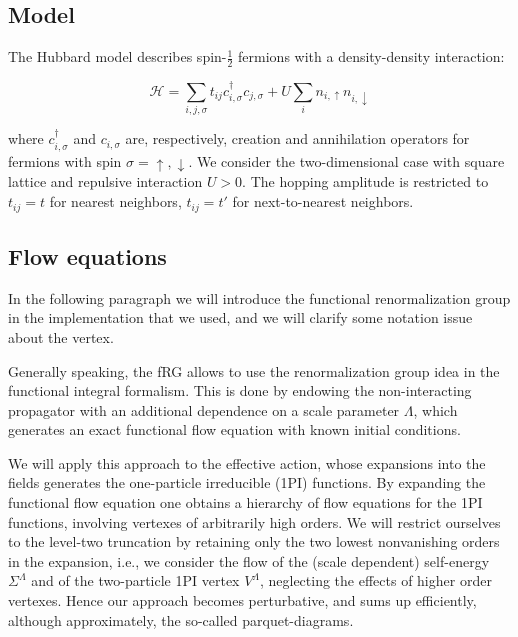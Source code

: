 
\subsection{Model}

The Hubbard model\cite{Hubbard1963} describes spin-$\frac{1}{2}$ fermions with a density-density interaction:

\begin{equation}
\mathcal{H} = \sum_{i,j,\sigma} t_{ij} c^{\dagger}_{i,\sigma} c_{j,\sigma} + U \sum_{i} n_{i,\uparrow} n_{i,\downarrow}
\end{equation}

where $c^{\dagger}_{i,\sigma}$ and $c_{i,\sigma}$ are, respectively, creation and annihilation operators 
for fermions with spin $\sigma=\uparrow,\downarrow$. We consider the two-dimensional case with square lattice and repulsive interaction $U>0$. The hopping amplitude is restricted to $t_{ij} = t$ for nearest neighbors, $t_{ij}=t'$ for next-to-nearest neighbors.




\subsection{Flow equations}


In the following paragraph we will introduce the functional renormalization group\cite{Metzner2012,Platt2013} in the implementation that we used, and we will clarify some notation issue about the vertex. 

Generally speaking, the fRG allows to use the renormalization group idea in the functional integral formalism. 
This is done by endowing the non-interacting propagator with an additional dependence on a scale parameter $\Lambda$, which generates an exact functional flow equation with known initial conditions. 

We will apply this approach to the effective action, whose expansions into the fields generates the one-particle irreducible (1PI)  functions. By expanding the functional flow equation one obtains a hierarchy of flow equations for the 1PI functions, involving vertexes of arbitrarily  high orders. 
We will restrict ourselves to the level-two truncation by retaining only the two lowest nonvanishing orders in the expansion, i.e., we consider the flow of the (scale dependent) self-energy $\Sigma^\Lambda$ and of the two-particle 1PI vertex $V^\Lambda$, neglecting the effects of higher order vertexes. 
Hence our approach becomes perturbative, and sums up efficiently, although approximately, the so-called parquet-diagrams\cite{Binz2002,Binz2003,Kugler2017}. 

